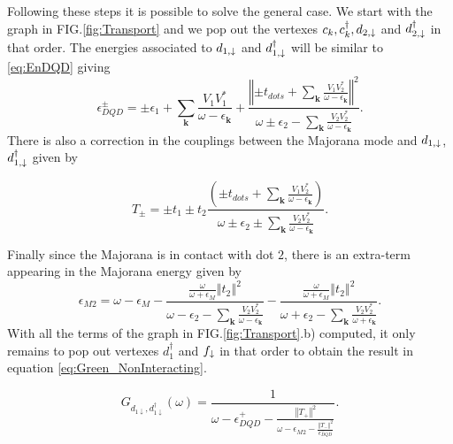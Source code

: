 \documentclass[showpacs,aps,prb,reprint,superscriptaddress]{revtex4-1}
\begin{document}
Following these steps it is possible to solve the general case.  We start with the graph in FIG.\ref{fig:Transport} and we pop out the vertexes $c_k,c^\dagger_k, d_{2,\downarrow}$ and $ d^\dagger_{2,\downarrow}$ in that order. The energies associated to $d_{1,\downarrow}$ and $d^\dagger_{1,\downarrow}$ will be similar to \eqref{eq:EnDQD} giving 
\begin{equation}
    \epsilon_{DQD}^{\pm}=\pm\epsilon_{1}+\sum_{\mathbf{k}}\frac{V_{1}V_{1}^{*}}{\omega-\epsilon_{\mathbf{k}}}+\frac{\left\Vert \pm t_{dots}+\sum_{\mathbf{k}}\frac{V_{1}V_{2}^{*}}{\omega-\epsilon_{\mathbf{k}}}\right\Vert ^{2}}{\omega\pm\epsilon_{2}-\sum_{\mathbf{k}}\frac{V_{2}V_{2}^{*}}{\omega-\epsilon_{\mathbf{k}}}}. \label{eq:epDQD}
\end{equation}
\noindent There is also a correction in the couplings between the Majorana mode and $d_{1,\downarrow}$, $d^\dagger_{1,\downarrow}$ given by 

\begin{equation}
    T_{\pm}=\pm t_{1}\pm t_{2}\frac{\left(\pm t_{dots}+\sum_{\mathbf{k}}\frac{V_{1}V_{2}^{*}}{\omega-\epsilon_{\mathbf{k}}}\right)}{\omega\pm\epsilon_{2}\pm\sum_{\mathbf{k}}\frac{V_{2}V_{2}^{*}}{\omega-\epsilon_{\mathbf{k}}}}. \label{eq:T+-}
\end{equation}

Finally since the Majorana is in contact with dot $2$, there is an extra-term appearing in the  Majorana energy given by 
\begin{equation}
    \epsilon_{M2}=\omega-\epsilon_{M}-\frac{\frac{\omega}{\omega+\epsilon_{M}}\left\Vert t_{2}\right\Vert ^{2} } {\omega-\epsilon_{2}-\sum_{\mathbf{k}}\frac{V_{2}V_{2}^{*}}{\omega-\epsilon_{\mathbf{k}}}}-\frac{\frac{\omega}{\omega+\epsilon_{M}}\left\Vert t_{2}\right\Vert ^{2}}{\omega+\epsilon_{2}-\sum_{\mathbf{k}}\frac{V_{2}V_{2}^{*}}{\omega+\epsilon_{\mathbf{k}}}}. \label{eq:M2_append}
\end{equation}
With all the terms of the graph in FIG.\ref{fig:Transport}.b) computed, it only remains to pop out vertexes $d^\dagger_1$ and $f_\downarrow$ in that order to obtain the result in equation \eqref{eq:Green_NonInteracting}. 


\begin{equation}
    G_{{d_{1\downarrow},d_{1\downarrow}^{\dagger}}}\left(\omega\right)=\frac{1}{\omega-\epsilon_{DQD}^{+}-\frac{\left\Vert T_{+}\right\Vert ^{2}}{\omega-\epsilon_{M2}-\frac{\left\Vert T_{-}\right\Vert ^{2}}{\epsilon_{DQD}^{-}}}}.
     \label{eq:2Green_NonInteracting}
\end{equation}
\end{document}
